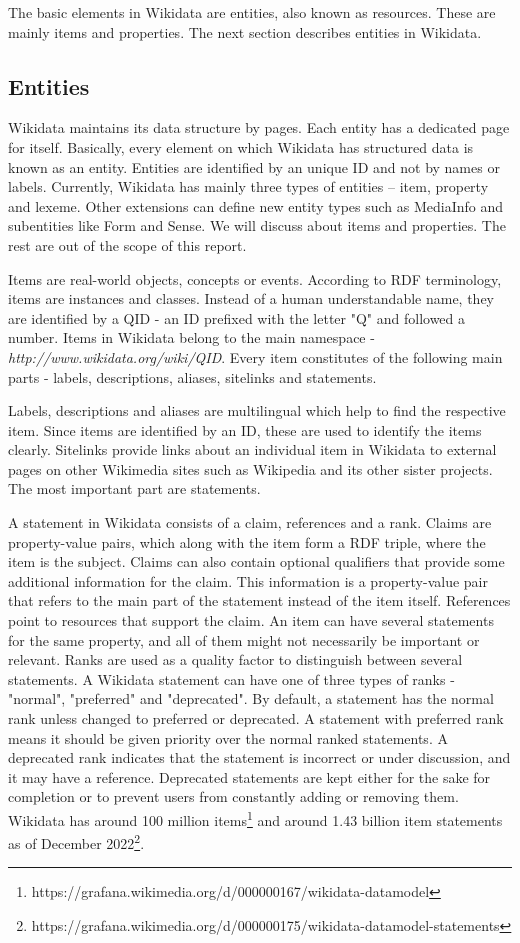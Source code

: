 \documentclass[12 pt, a4paper]{report}
\theoremstyle{definition}
\begin{document}
The basic elements in Wikidata are entities, also known as resources. These are mainly items and properties. The next section describes entities in Wikidata. 

\subsection{Entities}
Wikidata maintains its data structure by pages. Each entity has a dedicated page for itself. Basically, every element on which Wikidata has structured data is known as an entity\cite{Erxleben2014}. Entities are identified by an unique ID and not by names or labels. Currently, Wikidata has mainly three types of entities – item, property and lexeme. Other extensions can define new entity types such as MediaInfo and subentities like Form and Sense. We will discuss about items and properties. The rest are out of the scope of this report.

Items are real-world objects, concepts or events. According to RDF terminology, items are instances and classes. Instead of a human understandable name, they are identified by a QID - an ID prefixed with the letter "Q" and followed a number. Items in Wikidata belong to the main namespace - \textit{http://www.wikidata.org/wiki/QID}. Every item constitutes of the following main parts - labels, descriptions, aliases, sitelinks and statements\cite{Erxleben2014}.

Labels, descriptions and aliases are multilingual which help to find the respective item. Since items are identified by an ID, these are used to identify the items clearly. Sitelinks provide links about an individual item in Wikidata to external pages on other Wikimedia sites such as Wikipedia and its other sister projects. The most important part are statements. 

A statement in Wikidata consists of a claim, references and a rank. Claims are property-value pairs, which along with the item form a RDF triple, where the item is the subject. Claims can also contain optional qualifiers that provide some additional information for the claim. This information is a property-value pair that refers to the main part of the statement instead of the item itself\cite{Erxleben2014}. References point to resources that support the claim. An item can have several statements for the same property, and all of them might not necessarily be important or relevant. Ranks are used as a quality factor to distinguish between several statements. A Wikidata statement can have one of three types of ranks - "normal", "preferred" and "deprecated". By default, a statement has the normal rank unless changed to preferred or deprecated. A statement with preferred rank means it should be given priority over the normal ranked statements. A deprecated rank indicates that the statement is incorrect or under discussion, and it may have a reference. Deprecated statements are kept either for the sake for completion or to prevent users from constantly adding or removing them. Wikidata has around 100 million items\footnote{https://grafana.wikimedia.org/d/000000167/wikidata-datamodel} and around 1.43 billion item statements as of December 2022\footnote{https://grafana.wikimedia.org/d/000000175/wikidata-datamodel-statements}.
\end{document}
